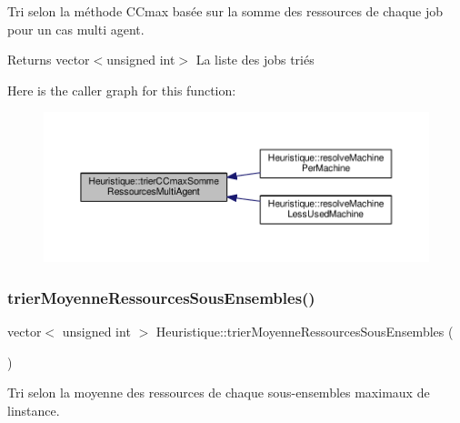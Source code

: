 Tri selon la méthode C\+Cmax basée sur la somme des ressources de chaque job pour un cas multi agent. 

\begin{DoxyReturn}{Returns}
vector$<$unsigned int$>$ La liste des jobs triés 
\end{DoxyReturn}
Here is the caller graph for this function\+:
\nopagebreak
\begin{figure}[H]
\begin{center}
\leavevmode
\includegraphics[width=350pt]{classHeuristique_aca0409bb9bab82ae4d47c13f3838d04d_icgraph}
\end{center}
\end{figure}
\mbox{\label{classHeuristique_a4541884c49c13e08ee6c73c919388fd3}} 
\subsubsection{\texorpdfstring{trier\+Moyenne\+Ressources\+Sous\+Ensembles()}{trierMoyenneRessourcesSousEnsembles()}}
{\footnotesize\ttfamily vector$<$ unsigned int $>$ Heuristique\+::trier\+Moyenne\+Ressources\+Sous\+Ensembles (\begin{DoxyParamCaption}{ }\end{DoxyParamCaption})}



Tri selon la moyenne des ressources de chaque sous-\/ensembles maximaux de l\textquotesingle{}instance. 

